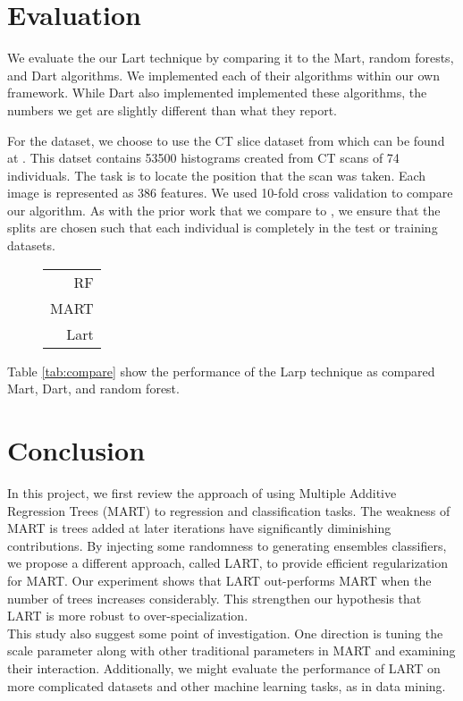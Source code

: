 \documentclass{article} %
\begin{document}
\section{Evaluation}

We evaluate the our Lart technique by comparing it to the Mart, random forests, and Dart\cite{dart} algorithms. We implemented each of their algorithms within our own framework. While Dart\cite{dart} also implemented implemented these algorithms, the numbers we get are slightly different than what they report. 

For the dataset, we choose to use the CT slice dataset from \cite{graf20112d} which can be found at \cite{uci_ctSlice}. This datset contains 53500 histograms created from CT scans of 74 individuals. The task is to locate the position that the scan was taken. Each image is represented as 386 features. We used 10-fold cross validation to compare our algorithm. As with the prior work that we compare to \cite{dart}, we ensure that the splits are chosen such that each individual is completely in the test or training datasets.


\begin{figure}	\centering
	\begin{tabular}{|r|}
 \hline
 
 \hline
               RF \\
               MART \\
               Lart \\\hline
	\end{tabular} 	
	\caption{ }
\end{figure}



Table \ref{tab:compare} show the performance of the Larp technique as compared Mart, Dart, and random forest.

\section{Conclusion}
In this project, we first review the approach of using Multiple Additive Regression Trees (MART) to regression and classification tasks. The weakness of MART is trees added at later iterations have significantly diminishing contributions. By injecting some randomness to generating ensembles classifiers, we propose a different approach, called LART, to provide efficient regularization for MART. Our experiment shows that LART out-performs MART when the number of trees increases considerably. This strengthen our hypothesis that LART is more robust to over-specialization.\\

This study also suggest some point of investigation. One direction is tuning the scale parameter along with other traditional parameters in MART and examining their interaction. Additionally, we might evaluate the performance of LART on more complicated datasets and other machine learning tasks, as in data mining.



\nocite{*}


\end{document}
